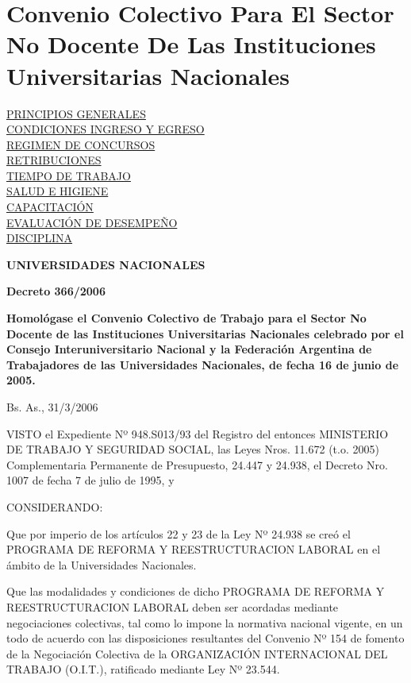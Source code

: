 \documentclass[]{article}
\date{}
\begin{document}
\section{Convenio Colectivo Para El Sector No Docente De Las
Instituciones Universitarias
Nacionales}\label{convenio-colectivo-para-el-sector-no-docente-de-las-instituciones-universitarias-nacionales}

\hyperref[principios-generales]{PRINCIPIOS GENERALES}\\
\hyperref[condiciones-para-el-ingreso-y-egreso]{CONDICIONES INGRESO Y
EGRESO}\\
\hyperref[regimen-de-concursos]{REGIMEN DE CONCURSOS}\\
\hyperref[retribuciones]{RETRIBUCIONES}\\
\hyperref[tiempo-de-trabajo]{TIEMPO DE TRABAJO}\\
\hyperref[salud-e-higiene]{SALUD E HIGIENE}\\
\hyperref[capacitacion]{CAPACITACIÓN}\\
\hyperref[evaluacion-de-desempeuxd1o]{EVALUACIÓN DE DESEMPEÑO}\\
\hyperref[regimen-disciplinario]{DISCIPLINA}

\textbf{UNIVERSIDADES NACIONALES}

\textbf{Decreto 366/2006}

\textbf{Homológase el Convenio Colectivo de Trabajo para el Sector No
Docente de las Instituciones Universitarias Nacionales celebrado por el
Consejo Interuniversitario Nacional y la Federación Argentina de
Trabajadores de las Universidades Nacionales, de fecha 16 de junio de
2005.}

Bs. As., 31/3/2006

VISTO el Expediente Nº 948.S013/93 del Registro del entonces MINISTERIO
DE TRABAJO Y SEGURIDAD SOCIAL, las Leyes Nros. 11.672 (t.o. 2005)
Complementaria Permanente de Presupuesto, 24.447 y 24.938, el Decreto
Nro. 1007 de fecha 7 de julio de 1995, y

CONSIDERANDO:

Que por imperio de los artículos 22 y 23 de la Ley Nº 24.938 se creó el
PROGRAMA DE REFORMA Y REESTRUCTURACION LABORAL en el ámbito de la
Universidades Nacionales.

Que las modalidades y condiciones de dicho PROGRAMA DE REFORMA Y
REESTRUCTURACION LABORAL deben ser acordadas mediante negociaciones
colectivas, tal como lo impone la normativa nacional vigente, en un todo
de acuerdo con las disposiciones resultantes del Convenio Nº 154 de
fomento de la Negociación Colectiva de la ORGANIZACIÓN INTERNACIONAL DEL
TRABAJO (O.I.T.), ratificado mediante Ley Nº 23.544.
\end{document}
